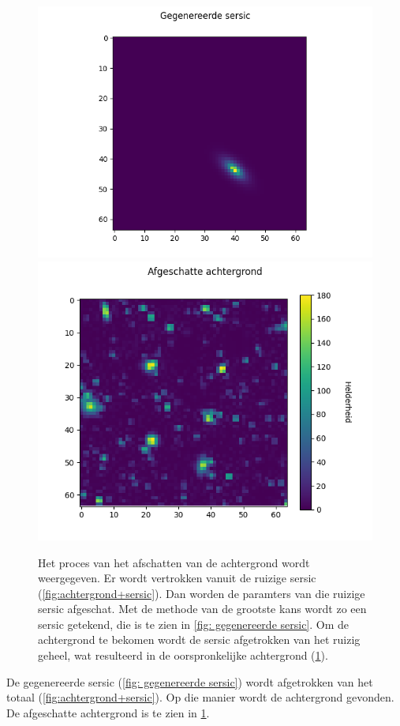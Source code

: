\begin{figure}
    \begin{minipage}{0.98\linewidth}
        \centering
        \includegraphics[width=0.95\linewidth]{Figures/gegenereerde_sersic.png}
        \label{fig: gegenereerde sersic}
        \centering
        \includegraphics[width=0.85\linewidth]{Figures/afgeschatte_achtergrond.png}
        \label{fig:afgeschatte achtergrond}
    \end{minipage}
    \caption{Het proces van het afschatten van de achtergrond wordt weergegeven. Er wordt vertrokken vanuit de ruizige sersic (\cref{fig:achtergrond+sersic}). Dan worden de paramters van die ruizige sersic afgeschat. Met de methode van de grootste kans wordt zo een sersic getekend, die is te zien in \cref{fig: gegenereerde sersic}. Om de achtergrond te bekomen wordt de sersic afgetrokken van het ruizig geheel, wat resulteerd in de oorspronkelijke achtergrond (\cref{fig:afgeschatte achtergrond}).}
\end{figure}
De gegenereerde sersic (\cref{fig: gegenereerde sersic}) wordt afgetrokken van het totaal (\cref{fig:achtergrond+sersic}). Op die manier wordt de achtergrond gevonden. De afgeschatte achtergrond is te zien in \cref{fig:afgeschatte achtergrond}. 

